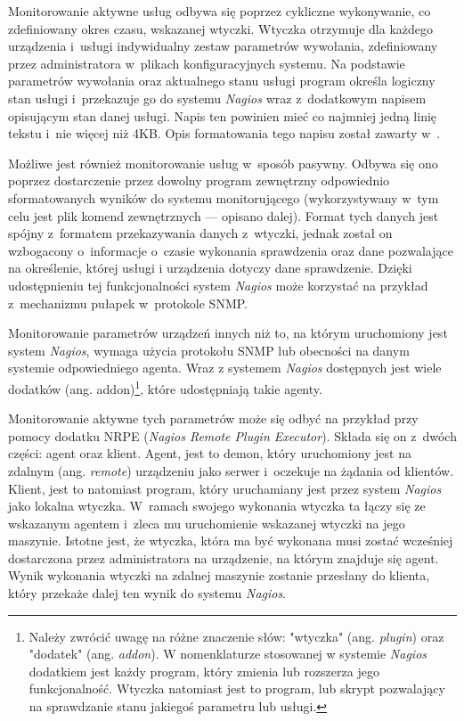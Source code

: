 Monitorowanie aktywne usług odbywa się poprzez cykliczne wykonywanie,
co zdefiniowany okres czasu, wskazanej wtyczki. Wtyczka otrzymuje dla
każdego urządzenia i~usługi indywidualny zestaw parametrów wywołania,
zdefiniowany przez administratora w~plikach konfiguracyjnych
systemu. Na podstawie parametrów wywołania oraz aktualnego stanu
usługi program określa logiczny stan usługi i~przekazuje go do systemu
{\em Nagios} wraz z~dodatkowym napisem opisującym stan danej usługi. Napis
ten powinien mieć co najmniej jedną linię tekstu i~nie więcej niż
4KB. Opis formatowania tego napisu został zawarty
w~\cite{www:NagiosPluginsTutorial}. 

Możliwe jest również monitorowanie usług w~sposób pasywny. Odbywa się
ono poprzez dostarczenie przez dowolny program zewnętrzny odpowiednio
sformatowanych wyników do systemu monitorującego (wykorzystywany w~tym
celu jest plik komend zewnętrznych --- opisano dalej). Format tych
danych jest spójny z~formatem przekazywania danych z~wtyczki, jednak
został on wzbogacony o~informacje o~czasie wykonania sprawdzenia oraz
dane pozwalające na określenie, której usługi i urządzenia dotyczy
dane sprawdzenie. Dzięki udostępnieniu tej funkcjonalności system
{\em Nagios} może korzystać na przykład z~mechanizmu pułapek w~protokole
SNMP.

Monitorowanie parametrów urządzeń innych niż to, na którym uruchomiony
jest system {\em Nagios}, wymaga użycia protokołu SNMP lub obecności na
danym systemie odpowiedniego agenta. Wraz z systemem {\em Nagios} dostępnych
jest wiele dodatków (ang. addon)\footnote{Należy zwrócić uwagę na
  różne znaczenie słów: "wtyczka" (ang. {\em plugin}) oraz "dodatek"
  (ang. {\em addon}). W nomenklaturze stosowanej w systemie {\em Nagios}
  dodatkiem jest każdy program, który zmienia lub rozszerza jego
  funkcjonalność. Wtyczka natomiast jest to program, lub skrypt
  pozwalający na sprawdzanie stanu jakiegoś parametru lub usługi.},
które udostępniają takie agenty.

Monitorowanie aktywne tych parametrów może się odbyć na przykład przy
pomocy dodatku NRPE ({\em Nagios Remote Plugin Executor}). Składa się
on z~dwóch części: agent oraz klient. Agent, jest to demon, który
uruchomiony jest na zdalnym (ang. {\em remote}) urządzeniu jako serwer
i~oczekuje na żądania od klientów. Klient, jest to natomiast program,
który uruchamiany jest przez system {\em Nagios} jako lokalna
wtyczka. W~ramach swojego wykonania wtyczka ta łączy się ze wskazanym
agentem i~zleca mu uruchomienie wskazanej wtyczki na jego
maszynie. Istotne jest, że wtyczka, która ma być wykonana musi zostać
wcześniej dostarczona przez administratora na urządzenie, na którym
znajduje się agent. Wynik wykonania wtyczki na zdalnej maszynie
zostanie przesłany do klienta, który przekaże dalej ten wynik do
systemu {\em Nagios}.

